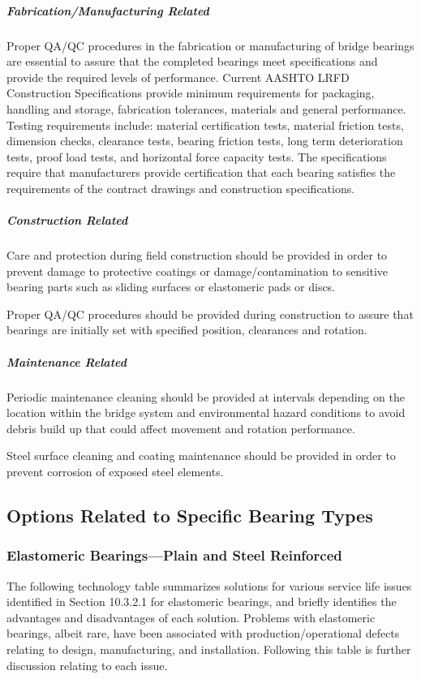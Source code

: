 \subparagraph{Fabrication/Manufacturing Related}
Proper QA/QC procedures in the fabrication or manufacturing of bridge bearings are essential to assure that the
completed bearings meet specifications and provide the required levels of performance. Current AASHTO LRFD Construction Specifications provide minimum requirements for packaging, handling and storage, fabrication
tolerances, materials and general performance. Testing requirements include: material certification tests, material
friction tests, dimension checks, clearance tests, bearing friction tests, long term deterioration tests, proof load tests,
and horizontal force capacity tests. The specifications require that manufacturers provide certification that each
bearing satisfies the requirements of the contract drawings and construction specifications.

\subparagraph{Construction Related}
Care and protection during field construction should be provided in order to prevent damage to protective
coatings or damage/contamination to sensitive bearing parts such as sliding surfaces or elastomeric pads or discs.

Proper QA/QC procedures should be provided during construction to assure that bearings are initially set with
specified position, clearances and rotation.

\subparagraph{Maintenance Related}
Periodic maintenance cleaning should be provided at intervals depending on the location within the bridge
system and environmental hazard conditions to avoid debris build up that could affect movement and rotation
performance.

Steel surface cleaning and coating maintenance should be provided in order to prevent corrosion of exposed steel
elements.


\subsection{Options Related to Specific Bearing Types}

\subsubsection{Elastomeric Bearings—Plain and Steel Reinforced}
The following technology table summarizes solutions for various service life issues identified in Section 10.3.2.1
for elastomeric bearings, and briefly identifies the advantages and disadvantages of each solution. Problems with
elastomeric bearings, albeit rare, have been associated with production/operational defects relating to design,
manufacturing, and installation. Following this table is further discussion relating to each issue.

